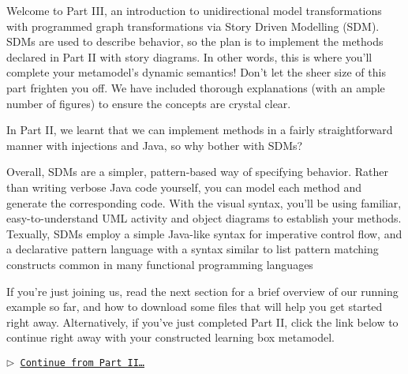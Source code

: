 \genHeader
{}

Welcome to Part III, an introduction to unidirectional model transformations with programmed graph transformations via Story Driven Modelling (SDM).
SDMs are used to describe behavior, so the plan is to implement the methods declared in Part II with story diagrams. In other words,
this is where you'll complete your metamodel's dynamic semantics! Don't let the sheer size of this part frighten you off. We have included thorough
explanations (with an ample number of figures) to ensure the concepts are crystal clear.

In Part II, we learnt that we can implement methods in a fairly straightforward manner with injections and Java, so why bother with SDMs?

Overall, SDMs are a simpler, pattern-based way of specifying behavior. Rather than writing verbose Java code yourself, you can model each method and generate
the corresponding code. With the visual syntax, you'll be using familiar, easy-to-understand UML activity and object diagrams to establish your methods.
Texually, SDMs employ a simple Java-like syntax for imperative control flow, and a declarative pattern language with a syntax similar to list pattern matching
constructs common in many functional programming languages

If you're just joining us, read the next section for a brief overview of our running example so far, and how to download some files that will help you get
started right away. Alternatively, if you've just completed Part II, click the link below to continue right away with your constructed learning box metamodel.

\begin{center}\texttt{$\triangleright$ \hyperlink{explanation}{Continue from Part II\ldots}}\end{center}
